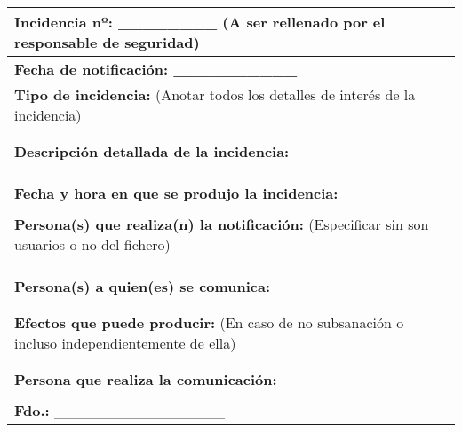 \documentclass[a4paper,11pt,bibtotoc,noliststotoc]{scrbook}
\begin{document}
\begin{center}
\begin{supertabular}{|p{17cm}|}
	\hline
	\large \textbf{Incidencia nº:} \_\_\_\_\_\_\_\_ \small (A ser rellenado por el responsable de seguridad)  \\
	\hline
	\large \textbf{Fecha de notificación: \_\_\_\_\_\_\_\_\_\_} \\
	\hline
	\large \textbf{Tipo de incidencia:} \small (Anotar todos los detalles de interés de la incidencia)  \\
	\\
	\\
	\hline
	\large \textbf{Descripción detallada de la incidencia:}  \\
	\\
	\\
	\\
	\hline
	\large \textbf{Fecha y hora en que se produjo la incidencia:}  \\
	\\
	\hline
	\large \textbf{Persona(s) que realiza(n) la notificación:} \small (Especificar sin son usuarios o no del fichero)  \\
	\\
	\\
	\\
	\hline
	\large \textbf{Persona(s) a quien(es) se comunica:}  \\
	\\
	\\
	\hline
	\large \textbf{Efectos que puede producir:} \small (En caso de no subsanación o incluso independientemente de ella)  \\
	\\
	\\
	\hline
	\textbf{Persona que realiza la comunicación:}  \\
	\\
	\textbf{Fdo.:} \_\_\_\_\_\_\_\_\_\_\_\_\_\_\_\_ \\
	\hline
\end{supertabular}
\end{center}





\backmatter


\end{document}
